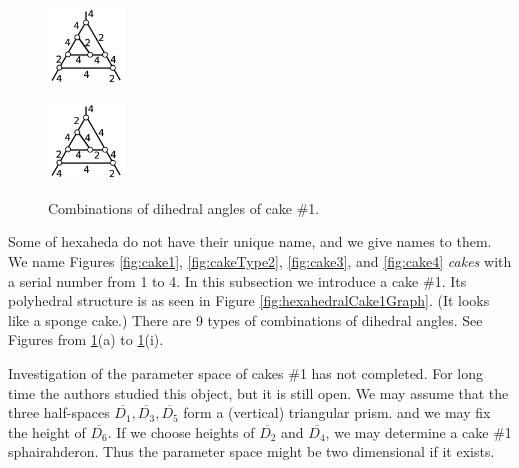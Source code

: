 \documentclass[suppldata, dvipdfmx]{interact}
\theoremstyle{plain}%
\theoremstyle{definition}
\theoremstyle{remark}
\theoremstyle{problemstyle}
\begin{document}
\begin{figure}[h!tbp]
\begin{minipage}[t]{0.195\textwidth}
   \label{fig:cake1j}
  \end{minipage}
 \hspace*{\fill}
  \begin{minipage}[t]{0.195\textwidth}
   \centering
   \includegraphics[width=0.8in, keepaspectratio]{./img/HexahedraWithSphericalFaces/hexahedralCake1/k.jpg}
   \label{fig:cake1k}
  \end{minipage}
 \hspace*{\fill}
  \begin{minipage}[t]{0.195\textwidth}
   \centering
   \includegraphics[width=0.8in, keepaspectratio]{./img/HexahedraWithSphericalFaces/hexahedralCake1/m.jpg}
   \label{fig:cake1m}
  \end{minipage}
  \hspace*{\fill}
  \caption{Combinations of dihedral angles of cake \#1.}
  \label{fig:hexahedralCake1List}
\end{figure}

Some of hexaheda do not have their unique name, and we give names to them.  
We name Figures \ref{fig:cake1}, \ref{fig:cakeType2}, \ref{fig:cake3}, and \ref{fig:cake4} {\it cakes} with a serial number from 1 to 4.   
In this subsection we introduce a cake \#1.  
Its polyhedral structure is as seen in  
Figure \ref{fig:hexahedralCake1Graph}. 
(It looks like a sponge cake.)  
There are 9 types of combinations of dihedral angles.  See Figures from
\ref{fig:hexahedralCake1List}(a) to \ref{fig:hexahedralCake1List}(i).

Investigation of the parameter space of cakes \#1 has not completed.  
For long time the authors studied this object, but it is still open.
We may assume that the three half-spaces $\overline{D_1}, \overline{D_3}, \overline{D_5}$ form a (vertical) triangular prism. and we may fix the height of $\overline{D_6}$.  If we choose heights of $\overline{D_2}$ and $\overline{D_4}$, we may determine a cake \#1 sphairahderon.  Thus the parameter space might be two dimensional if it exists.
\end{document}
